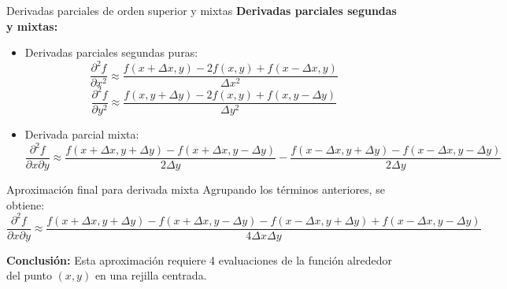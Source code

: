 \documentclass[main.tex]{subfiles}
\begin{document}
\begin{frame}{Derivadas parciales de orden superior y mixtas}
\textbf{Derivadas parciales segundas y mixtas:}
\begin{itemize}
  \item Derivadas parciales segundas puras:
  \[ \frac{\partial^2 f}{\partial x^2} \approx \frac{f(x+\Delta x, y) - 2f(x,y) + f(x - \Delta x, y)}{\Delta x^2} \]
  \[ \frac{\partial^2 f}{\partial y^2} \approx \frac{f(x, y+\Delta y) - 2f(x,y) + f(x, y - \Delta y)}{\Delta y^2} \]
  \item Derivada parcial mixta:
  \[ \frac{\partial^2 f}{\partial x\partial y} \approx \frac{f(x + \Delta x, y + \Delta y) - f(x + \Delta x, y - \Delta y)}{2\Delta y} - \frac{f(x - \Delta x, y + \Delta y) - f(x - \Delta x, y - \Delta y)}{2\Delta y} \]
\end{itemize}
\end{frame}

\begin{frame}{Aproximación final para derivada mixta}
Agrupando los términos anteriores, se obtiene:
\[ \frac{\partial^2 f}{\partial x \partial y} \approx \frac{f(x + \Delta x, y + \Delta y) - f(x + \Delta x, y - \Delta y) - f(x - \Delta x, y + \Delta y) + f(x - \Delta x, y - \Delta y)}{4\Delta x \Delta y} \]

\textbf{Conclusión:} Esta aproximación requiere 4 evaluaciones de la función alrededor del punto $(x,y)$ en una rejilla centrada.
\end{frame}
\end{document}
